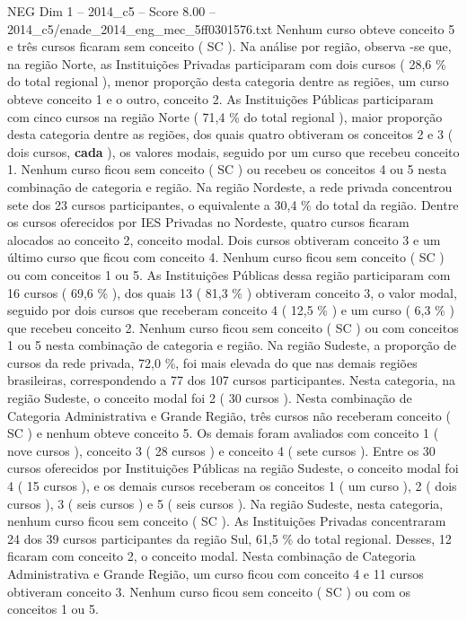 \begin{textsample}{NEG Dim 1 – 2014\_c5 – Score 8.00 – 2014\_c5/enade\_2014\_eng\_mec\_5ff0301576.txt}
Nenhum curso obteve conceito 5 e três cursos ficaram sem conceito ( SC ).
Na análise por região, observa -se que, na região Norte, as Instituições Privadas participaram com dois cursos ( 28,6 \% do total regional ), menor proporção desta categoria dentre as regiões, um curso obteve conceito 1 e o outro, conceito 2.
As Instituições Públicas participaram com cinco cursos na região Norte ( 71,4 \% do total regional ), maior proporção desta categoria dentre as regiões, dos quais quatro obtiveram os conceitos 2 e 3 ( dois cursos, \textbf{cada} ), os valores modais, seguido por um curso que recebeu conceito 1.
Nenhum curso ficou sem conceito ( SC ) ou recebeu os conceitos 4 ou 5 nesta combinação de categoria e região.
Na região Nordeste, a rede privada concentrou sete dos 23 cursos participantes, o equivalente a 30,4 \% do total da região.
Dentre os cursos oferecidos por IES Privadas no Nordeste, quatro cursos ficaram alocados ao conceito 2, conceito modal.
Dois cursos obtiveram conceito 3 e um último curso que ficou com conceito 4.
Nenhum curso ficou sem conceito ( SC ) ou com conceitos 1 ou 5.
As Instituições Públicas dessa região participaram com 16 cursos ( 69,6 \% ), dos quais 13 ( 81,3 \% ) obtiveram conceito 3, o valor modal, seguido por dois cursos que receberam conceito 4 ( 12,5 \% ) e um curso ( 6,3 \% ) que recebeu conceito 2.
Nenhum curso ficou sem conceito ( SC ) ou com conceitos 1 ou 5 nesta combinação de categoria e região.
Na região Sudeste, a proporção de cursos da rede privada, 72,0 \%, foi mais elevada do que nas demais regiões brasileiras, correspondendo a 77 dos 107 cursos participantes.
Nesta categoria, na região Sudeste, o conceito modal foi 2 ( 30 cursos ).
Nesta combinação de Categoria Administrativa e Grande Região, três cursos não receberam conceito ( SC ) e nenhum obteve conceito 5.
Os demais foram avaliados com conceito 1 ( nove cursos ), conceito 3 ( 28 cursos ) e conceito 4 ( sete cursos ).
Entre os 30 cursos oferecidos por Instituições Públicas na região Sudeste, o conceito modal foi 4 ( 15 cursos ), e os demais cursos receberam os conceitos 1 ( um curso ), 2 ( dois cursos ), 3 ( seis cursos ) e 5 ( seis cursos ).
Na região Sudeste, nesta categoria, nenhum curso ficou sem conceito ( SC ).
As Instituições Privadas concentraram 24 dos 39 cursos participantes da região Sul, 61,5 \% do total regional.
Desses, 12 ficaram com conceito 2, o conceito modal.
Nesta combinação de Categoria Administrativa e Grande Região, um curso ficou com conceito 4 e 11 cursos obtiveram conceito 3.
Nenhum curso ficou sem conceito ( SC ) ou com os conceitos 1 ou 5.

\end{textsample}
